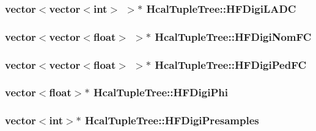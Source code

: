 \subsubsection[{H\+F\+Digi\+L\+A\+D\+C}]{\setlength{\rightskip}{0pt plus 5cm}vector$<$vector$<$int$>$ $>$$\ast$ Hcal\+Tuple\+Tree\+::\+H\+F\+Digi\+L\+A\+D\+C}\label{class_hcal_tuple_tree_aba96a4641a9750ed5bcc626abbe44c3c}
\hypertarget{class_hcal_tuple_tree_a237a14d107a2090e46f21ffe7500123d}{}
\subsubsection[{H\+F\+Digi\+Nom\+F\+C}]{\setlength{\rightskip}{0pt plus 5cm}vector$<$vector$<$float$>$ $>$$\ast$ Hcal\+Tuple\+Tree\+::\+H\+F\+Digi\+Nom\+F\+C}\label{class_hcal_tuple_tree_a237a14d107a2090e46f21ffe7500123d}
\hypertarget{class_hcal_tuple_tree_a66aa7dc7b2ca36a103449a29aa6af319}{}
\subsubsection[{H\+F\+Digi\+Ped\+F\+C}]{\setlength{\rightskip}{0pt plus 5cm}vector$<$vector$<$float$>$ $>$$\ast$ Hcal\+Tuple\+Tree\+::\+H\+F\+Digi\+Ped\+F\+C}\label{class_hcal_tuple_tree_a66aa7dc7b2ca36a103449a29aa6af319}
\hypertarget{class_hcal_tuple_tree_a778805ed9ac0fb9bd7c0ada3adfb05ef}{}
\subsubsection[{H\+F\+Digi\+Phi}]{\setlength{\rightskip}{0pt plus 5cm}vector$<$float$>$$\ast$ Hcal\+Tuple\+Tree\+::\+H\+F\+Digi\+Phi}\label{class_hcal_tuple_tree_a778805ed9ac0fb9bd7c0ada3adfb05ef}
\hypertarget{class_hcal_tuple_tree_ad7090a8222127b46bd6c6b4cafc79d43}{}
\subsubsection[{H\+F\+Digi\+Presamples}]{\setlength{\rightskip}{0pt plus 5cm}vector$<$int$>$$\ast$ Hcal\+Tuple\+Tree\+::\+H\+F\+Digi\+Presamples}\label{class_hcal_tuple_tree_ad7090a8222127b46bd6c6b4cafc79d43}
\hypertarget{class_hcal_tuple_tree_ae3043c51037d009294ec7567b8c9ce01}{}
